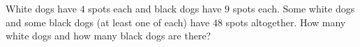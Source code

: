 White dogs have $4$ spots each and black dogs have $9$ spots each. Some white dogs and some black dogs (at least one of each) have $48$ spots altogether. How many white dogs and how many black dogs are there?
